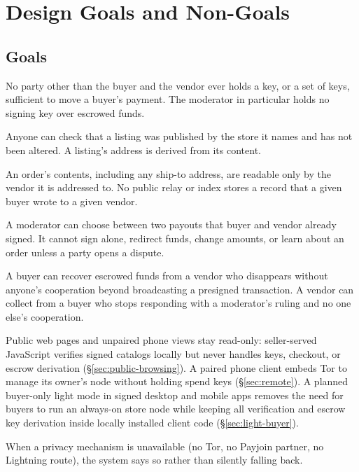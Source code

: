 \section{Design Goals and Non-Goals}
\label{sec:goals}

\subsection{Goals}

\begin{description}[leftmargin=1.2em]
  \item[G1. No custody.] No party other than the buyer and the vendor ever holds a key, or a set of keys, sufficient to move a buyer's payment. The moderator in particular holds no signing key over escrowed funds.
  \item[G2. Verifiable public catalog.] Anyone can check that a listing was published by the store it names and has not been altered. A listing's address is derived from its content.
  \item[G3. Private orders.] An order's contents, including any ship-to address, are readable only by the vendor it is addressed to. No public relay or index stores a record that a given buyer wrote to a given vendor.
  \item[G4. Bounded moderation.] A moderator can choose between two payouts that buyer and vendor already signed. It cannot sign alone, redirect funds, change amounts, or learn about an order unless a party opens a dispute.
  \item[G5. Liveness without a platform.] A buyer can recover escrowed funds from a vendor who disappears without anyone's cooperation beyond broadcasting a presigned transaction. A vendor can collect from a buyer who stops responding with a moderator's ruling and no one else's cooperation.
  \item[G6. Thin and light clients without web-served trust.] Public web pages and unpaired phone views stay read-only: seller-served JavaScript verifies signed catalogs locally but never handles keys, checkout, or escrow derivation (\S\ref{sec:public-browsing}). A paired phone client embeds Tor to manage its owner's node without holding spend keys (\S\ref{sec:remote}). A planned buyer-only light mode in signed desktop and mobile apps removes the need for buyers to run an always-on store node while keeping all verification and escrow key derivation inside locally installed client code (\S\ref{sec:light-buyer}).
  \item[G7. Honest degradation.] When a privacy mechanism is unavailable (no Tor, no Payjoin partner, no Lightning route), the system says so rather than silently falling back.
\end{description}

